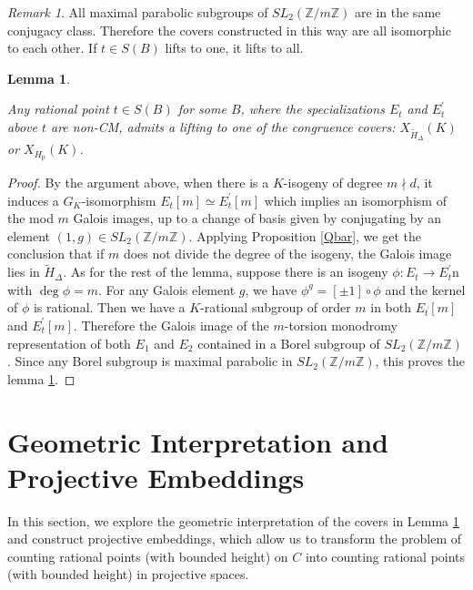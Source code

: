 \documentclass[12pt]{amsart}
\newtheorem{lem}[thm]{Lemma}
\theoremstyle{definition}
\theoremstyle{remark}
\newtheorem{remark}[thm]{Remark}
\numberwithin{equation}{section}
\newcommand{\Z}{\mathbb{Z}}
\begin{document}
\begin{remark}

All maximal parabolic subgroups of $SL_{2}(\Z/m\Z)$ are in the same conjugacy class. Therefore the covers constructed in this way are all isomorphic to each other. If $t \in S(B)$ lifts to one, it lifts to all.   	


\end{remark}



\begin{lem}\label{covers}
	
	Any rational point $t \in S(B)$ for some $B$, where the specializations $E_t$ and $E^{\prime}_t$ above $t$ are non-CM, admits a lifting to one of the congruence covers: $X_{\tilde{H}_{\Delta}}(K)$ or $X_{H_{\text{p}}}(K)$.
\end{lem}

\begin{proof}
	By the argument above, when there is a $K$-isogeny of degree $m \nmid d$, it induces a $G_{K}$-isomorphism $E_{t}[m] \simeq E^{\prime}_{t}[m]$ which implies an isomorphism of the mod $m$ Galois images, up to a change of basis given by conjugating by an element $(1,g) \in SL_{2}(\Z/m\Z)$. Applying Proposition \ref{Qbar}, we get the conclusion that if $m$ does not divide the degree of the isogeny, the Galois image lies in $\tilde{H}_{\Delta}$. 	
	As for the rest of the lemma, suppose there is an isogeny $\phi: E_t \to E^{\prime}_t$n with $\deg \phi =m$. For any Galois element $g$, we have $\phi^{g}=[\pm 1]\circ \phi$ and the kernel of $\phi$ is rational. Then we have a $K$-rational subgroup of order $m$ in both $E_t[m]$ and $E^{\prime}_t[m]$. Therefore the Galois image of the $m$-torsion monodromy representation of both $E_{1}$ and $E_{2}$ contained in a Borel subgroup of $SL_{2}(\Z/m\Z)$. Since any Borel subgroup is maximal parabolic in $SL_{2}(\Z/m\Z)$, this proves the lemma \ref{covers}.
\end{proof}

\section{Geometric Interpretation and Projective Embeddings}

In this section, we explore the geometric interpretation of the covers in Lemma \ref{covers} and construct projective embeddings, which allow us to transform the problem of counting rational points (with bounded height) on $C$ into counting rational points (with bounded height) in projective spaces. 
\end{document}
